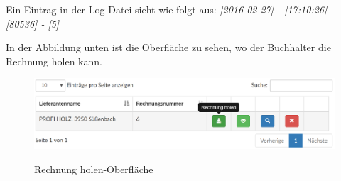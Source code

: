 \vspace{1cm}
Ein Eintrag in der Log-Datei sieht wie folgt aus: \newline 
\textit{[2016-02-27] - [17:10:26] - [80536] - [5]}

\vspace{1cm}
In der Abbildung unten ist die Oberfläche zu sehen, wo der Buchhalter die Rechnung holen kann.
\begin{figure}[!h]
    \centering
    \includegraphics[width=15cm]{figures/holencode.png}
    \label{fig:takebill}
    \caption{Rechnung holen-Oberfläche}
\end{figure}

